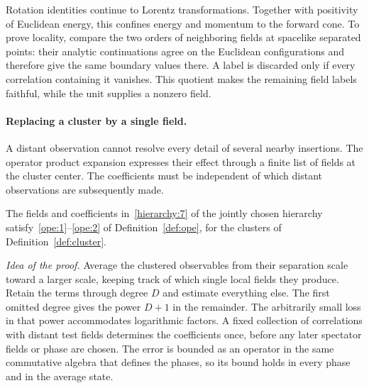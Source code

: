 Rotation identities continue to Lorentz transformations.
Together with positivity of Euclidean energy, this confines energy and momentum to the forward cone.
To prove locality, compare the two orders of neighboring fields at spacelike separated points: their analytic continuations agree on the Euclidean configurations and therefore give the same boundary values there.
A label is discarded only if every correlation containing it vanishes.
This quotient makes the remaining field labels faithful, while the unit supplies a nonzero field.


\paragraph{Replacing a cluster by a single field.}
A distant observation cannot resolve every detail of several nearby insertions.
The operator product expansion expresses their effect through a finite list of fields at the cluster center.
The coefficients must be independent of which distant observations are subsequently made.

\begin{proposition}\label{prop:ope}
The fields and coefficients in~\ref{hierarchy:7} of the jointly chosen hierarchy satisfy~\ref{ope:1}--\ref{ope:2} of Definition~\ref{def:ope}, for the clusters of Definition~\ref{def:cluster}.
\end{proposition}

\emph{Idea of the proof.}
Average the clustered observables from their separation scale toward a larger scale, keeping track of which single local fields they produce.
Retain the terms through degree $D$ and estimate everything else.
The first omitted degree gives the power $D+1$ in the remainder.
The arbitrarily small loss in that power accommodates logarithmic factors.
A fixed collection of correlations with distant test fields determines the coefficients once, before any later spectator fields or phase are chosen.
The error is bounded as an operator in the same commutative algebra that defines the phases, so its bound holds in every phase and in the average state.

